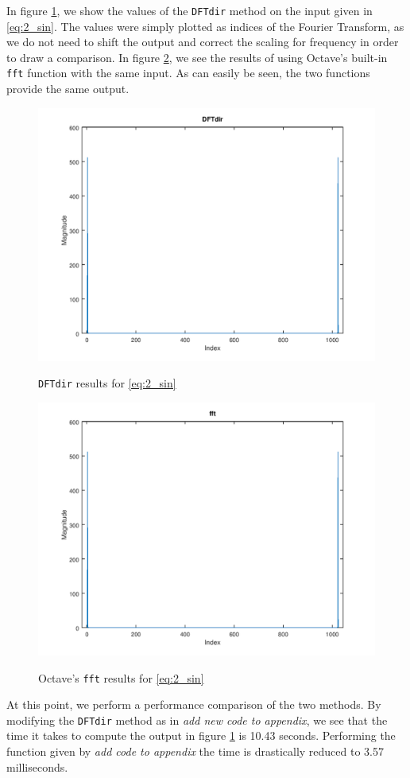\documentclass[a4paper, 12pt]{report}
\begin{document}
			In figure \ref{fig:2_dft}, we show the values of the \texttt{DFTdir} method on the input given in \eqref{eq:2_sin}. The values were simply plotted as indices of the Fourier Transform, as we do not need to shift the output and correct the scaling for frequency in order to draw a comparison. In figure \ref{fig:2_fft}, we see the results of using Octave's built-in \texttt{fft} function with the same input. As can easily be seen, the two functions provide the same output.

			\begin{figure}[H]
				\centering
				\includegraphics[width=.7\textwidth]{img/2_1.png}
				\label{fig:2_dft}
				\caption{\texttt{DFTdir} results for \eqref{eq:2_sin}}
			\end{figure}

			\begin{figure}[H]
				\centering
				\includegraphics[width=.7\textwidth]{img/2_2.png}
				\label{fig:2_fft}
				\caption{Octave's \texttt{fft} results for \eqref{eq:2_sin}}
			\end{figure}

			At this point, we perform a performance comparison of the two methods. By modifying the \texttt{DFTdir} method as in \textit{add new code to appendix}, we see that the time it takes to compute the output in figure \ref{fig:2_dft} is 10.43 seconds. Performing the function given by \textit{add code to appendix} the time is drastically reduced to 3.57 milliseconds.
\end{document}
